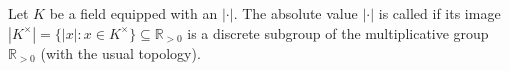 \begin{definition} \label{definition:discrete_absolute_value_on_a_field}
Let $K$ be a field equipped with an $|\cdot|$. The absolute value $|\cdot|$ is called  if its image $|K^\times| = \{ |x| : x \in K^\times \} \subseteq \mathbb{R}_{> 0}$ is a discrete subgroup of the multiplicative group $\mathbb{R}_{>0}$ (with the usual topology).
\end{definition}
